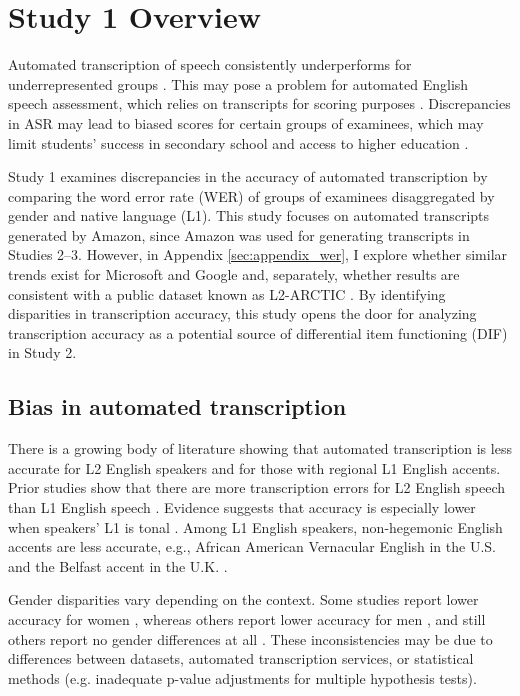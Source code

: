 \documentclass [PhD] {uclathes}
\begin{document}
\section{Study 1 Overview}

Automated transcription of speech consistently underperforms for underrepresented groups \citep{dichristofano2023, hutiri2022}. This may pose a problem for automated English speech assessment, which relies on transcripts for scoring purposes \citep{zechner2019automated, johnston2019using}. Discrepancies in ASR may lead to biased scores for certain groups of examinees, which may limit students' success in secondary school \citep{johnson2020} and access to higher education \citep{johnson2019effects}. 

Study 1 examines discrepancies in the accuracy of automated transcription by comparing the word error rate (WER) of groups of examinees disaggregated by gender and native language (L1). This study focuses on automated transcripts generated by Amazon, since Amazon was used for generating transcripts in Studies 2–3. However, in Appendix \ref{sec:appendix_wer}, I explore whether similar trends exist for Microsoft and Google and, separately, whether results are consistent with a public dataset known as L2-ARCTIC \citep[][Appendix \ref{sec:appendix_l2}]{zhao2018l2}. By identifying disparities in transcription accuracy, this study opens the door for analyzing transcription accuracy as a potential source of differential item functioning (DIF) in Study 2.

\subsection{Bias in automated transcription}

There is a growing body of literature showing that automated transcription is less accurate for L2 English speakers and for those with regional L1 English accents. Prior studies show that there are more transcription errors for L2 English speech than L1 English speech \citep{dichristofano2023, markl2022, meyer2020}. Evidence suggests that accuracy is especially lower when speakers' L1 is tonal \citep{chan2022training}. Among L1 English speakers, non-hegemonic English accents are less accurate, e.g., African American Vernacular English in the U.S. \citep{koenecke2020} and the Belfast accent in the U.K. \citep{markl2022}.

Gender disparities vary depending on the context. Some studies report lower accuracy for women \citep{tatman2017a, hutiri2022}, whereas others report lower accuracy for men \citep{dichristofano2023, zuluaga2023, markl2022}, and still others report no gender differences at all \citep{chan2022training, tatman2017b}. These inconsistencies may be due to differences between datasets, automated transcription services, or statistical methods (e.g. inadequate p-value adjustments for multiple hypothesis tests).
\end{document}
